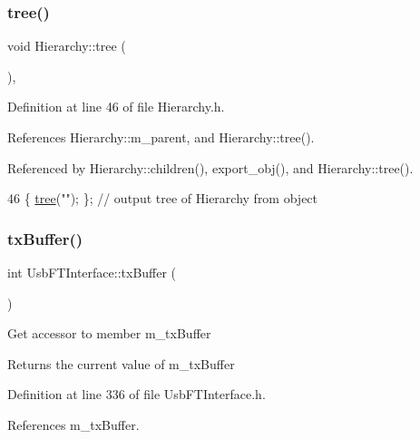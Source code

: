 \subsubsection{\texorpdfstring{tree()}{tree()}\hspace{0.1cm}{\footnotesize\ttfamily [2/2]}}
{\footnotesize\ttfamily void Hierarchy\+::tree (\begin{DoxyParamCaption}{ }\end{DoxyParamCaption})\hspace{0.3cm}{\ttfamily [inline]}, {\ttfamily [inherited]}}



Definition at line 46 of file Hierarchy.\+h.



References Hierarchy\+::m\+\_\+parent, and Hierarchy\+::tree().



Referenced by Hierarchy\+::children(), export\+\_\+obj(), and Hierarchy\+::tree().


\begin{DoxyCode}
46 \{ \hyperlink{classHierarchy_a594c294c5f60c230e106d522ed008212}{tree}(\textcolor{stringliteral}{""}); \};                     \textcolor{comment}{// output tree of Hierarchy from object}
\end{DoxyCode}
\mbox{\label{classUsbFTInterface_acac73d3fc1587437656bb7fe24e10906}} 
\subsubsection{\texorpdfstring{tx\+Buffer()}{txBuffer()}}
{\footnotesize\ttfamily int Usb\+F\+T\+Interface\+::tx\+Buffer (\begin{DoxyParamCaption}{ }\end{DoxyParamCaption})\hspace{0.3cm}{\ttfamily [inline]}}

Get accessor to member m\+\_\+tx\+Buffer \begin{DoxyReturn}{Returns}
the current value of m\+\_\+tx\+Buffer 
\end{DoxyReturn}


Definition at line 336 of file Usb\+F\+T\+Interface.\+h.



References m\+\_\+tx\+Buffer.



